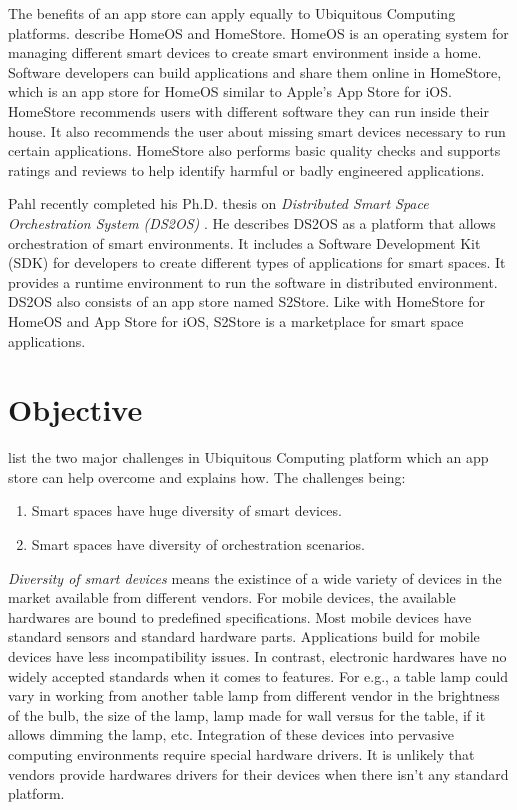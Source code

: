 The benefits of an app store can apply equally to Ubiquitous Computing platforms. \cite{dixon2010home} describe HomeOS and HomeStore. HomeOS is an operating system for managing different smart devices to create smart environment inside a home. Software developers can build applications and share them online in HomeStore, which is an app store for HomeOS similar to Apple's App Store for iOS. HomeStore recommends users with different software they can run inside their house. It also recommends the user about missing smart devices necessary to run certain applications. HomeStore also performs basic quality checks and supports ratings and reviews to help identify harmful or badly engineered applications.

Pahl recently completed his Ph.D. thesis on \emph{Distributed Smart Space Orchestration System (DS2OS)} \cite{pahl2014distributed}. He describes DS2OS as a platform that allows orchestration of smart environments. It includes a Software Development Kit (SDK) for developers to create different types of applications for smart spaces. It provides a runtime environment to run the software in distributed environment. DS2OS also consists of an app store named S2Store. Like with HomeStore for HomeOS and App Store for iOS, S2Store is a marketplace for smart space applications.

\section{Objective}

\cite{pahl2014distributed} list the two major challenges in Ubiquitous Computing platform which an app store can help overcome and explains how. The challenges being:

\begin{enumerate}
  \item Smart spaces have huge diversity of smart devices.
  \item Smart spaces have diversity of orchestration scenarios.
\end{enumerate}

\emph{Diversity of smart devices} means the existince of a wide variety of devices in the market available from different vendors. For mobile devices, the available hardwares are bound to predefined specifications. Most mobile devices have standard sensors and standard hardware parts. Applications build for mobile devices have less incompatibility issues. In contrast, electronic hardwares have no widely accepted standards when it comes to features. For e.g., a table lamp could vary in working from another table lamp from different vendor in the brightness of the bulb, the size of the lamp, lamp made for wall versus for the table, if it allows dimming the lamp, etc. Integration of these devices into pervasive computing environments require special hardware drivers. It is unlikely that vendors provide hardwares drivers for their devices when there isn't any standard platform.

